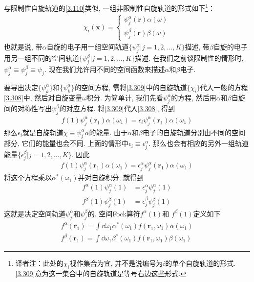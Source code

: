 与限制性自旋轨道的\autoref{3.110}类似, 
一组非限制性自旋轨道的形式如下\footnote{
译者注：此处的$\chi_i$视作集合为宜,
并不是说编号为$i$的单个自旋轨道的形式.
\autoref{3.309}意为这一集合中的自旋轨道是等号右边这些形式.}：
\begin{align}\label{3.309}
	\chi_i(\mathbf{x}) =
	\begin{cases*}
		\psi_j^\alpha(\mathbf{r})\alpha(\omega)\\
		\psi_j^\beta (\mathbf{r})\beta(\omega)
	\end{cases*}
\end{align}
也就是说, 
带$\alpha$自旋的电子用一组空间轨道$\{\psi_j^\alpha |j=1,2,\ldots,K \}$描述, 
带$\beta$自旋的电子用另一组不同的空间轨道$\{\psi_j^\beta |j=1,2,\ldots,K \}$描述. 
在我们之前谈限制性的情形时, 
$\psi_j^\alpha \equiv \psi_j^\beta \equiv \psi_j$. 
现在我们允许用不同的空间函数来描述$\alpha$和$\beta$电子. 


要导出决定$\{\psi_k^\alpha \}$和$\{\psi_k^\alpha \}$的空间方程, 
需将\autoref{3.309}中的自旋轨道$\{\chi_i\}$代入一般的\hft 方程\autoref{3.308}中, 
然后对自旋变量$\omega$积分. 
为简单计, 
我们先看$\psi_j^\alpha$的方程, 
然后用$\alpha$和$\beta$自旋间的对称性写出$\psi_j^\beta$的对应方程. 
将\autoref{3.309}代入\autoref{3.308}, 
得到
\begin{align}\label{3.310}
	f(1)\psi_j^\alpha(\mathbf{r}_1) \alpha(\omega_1) = \epsilon_i \psi_j^\alpha(\mathbf{r}_1) \alpha(\omega_1)
\end{align}
那么$\epsilon_i$就是自旋轨道$\chi\equiv\psi_j^\alpha\alpha$的能量. 
由于$\alpha$和$\beta$电子的自旋轨道分别由不同的空间部分, 
它们的能量也会不同. 
上面的情形中$\epsilon_i\equiv\epsilon^\alpha_j$. 
那么也会有相应的另外一组轨道能量$\{\epsilon_j^\beta | j=1,2,\ldots,K\}$. 
因此
\begin{align}\label{3.311}
	f(1)\psi_j^\alpha(\mathbf{r}_1) \alpha(\omega_1) = \epsilon_j^\alpha \psi_j^\alpha(\mathbf{r}_1) \alpha(\omega_1)
\end{align}
将这个方程乘以$\alpha^*(\omega_1)$并对自旋积分, 
就得到
\begin{align}
	f^\alpha(1)\psi_j^\alpha(1) & = \epsilon_j^\alpha \psi_j^\alpha(1) \label{3.312}\\
	f^\beta (1)\psi_j^\beta(1)  & = \epsilon_j^\beta \psi_j^\beta(1)\label{3.313}
\end{align}
这就是决定空间轨道$\psi_j^\alpha$和$\psi_j^\beta$的. 
空间Fock算符$f^\alpha(1)$和 $f^\beta (1)$定义如下
\begin{align}
	f^\alpha(\mathbf{r}_1) = \int\dd\omega_1 \alpha^*(\omega_1) f(\mathbf{r}_1,\omega_1)\alpha(\omega_1) \label{3.314}\\
	f^\beta(\mathbf{r}_1) = \int\dd\omega_1 \beta^*(\omega_1) f(\mathbf{r}_1,\omega_1)\beta(\omega_1) \label{3.315}
\end{align}

